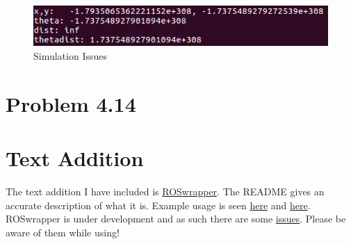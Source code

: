 \documentclass{article}
\begin{document}
\begin{figure}[htbp]
\centering
\includegraphics[scale=2.0]{VerandaIssue.png}
\caption{Simulation Issues}
\end{figure}


\newpage
\section{\textbf{Problem 4.14}}


\newpage
\section{\textbf{Text Addition}}
The text addition I have included is \href{https://github.com/macattackftw/ROSwrapper}{ROSwrapper}. The README gives an accurate description of what it is. Example usage is seen \href{https://github.com/macattackftw/ROSwrapper/blob/master/example_basenode.py}{here} and \href{https://github.com/macattackftw/ROSwrapper/blob/master/example_derivednode.py}{here}. ROSwrapper is under development and as such there are some \href{https://github.com/macattackftw/ROSwrapper/issues}{issues}. Please be aware of them while using!
\end{document}
